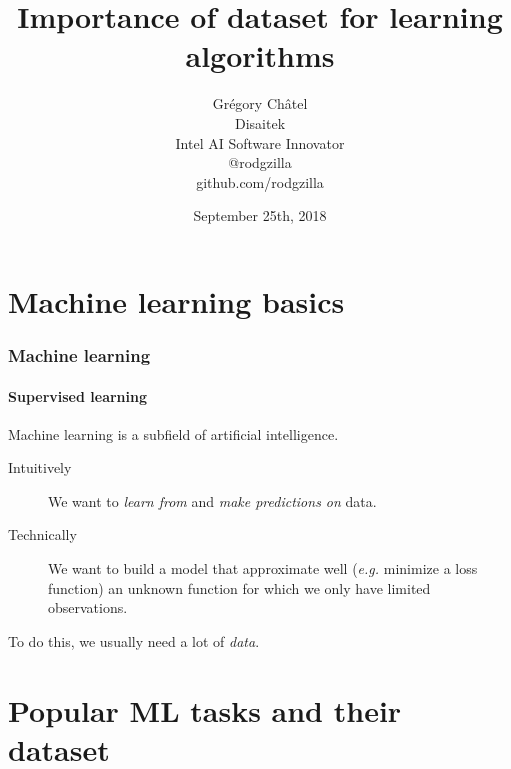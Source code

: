 \documentclass[10pt]{beamer}
\title{Importance of dataset for learning algorithms}
\author[G. Châtel]{Grégory Châtel\\\vspace{0.3cm}Disaitek\\Intel AI Software Innovator\\\vspace{0.3cm}@rodgzilla\\github.com/rodgzilla}
\date{September 25th, 2018}
\begin{document}
\begin{frame}

  \maketitle

\end{frame}

\begin{frame}

  \tableofcontents

\end{frame}

\section{Machine learning basics}

\begin{frame}

  \frametitle{Machine learning}

  \framesubtitle{Supervised learning}

  Machine learning is a subfield of artificial intelligence.

  \bigskip

  \begin{description}
    \item[Intuitively] We want to \emph{learn from} and \emph{make predictions
    on} data.

    \medskip

    \item[Technically] We want to build a model that approximate well
      (\textit{e.g.} minimize a loss function) an unknown function for
      which we only have limited observations.
  \end{description}

  \bigskip

  To do this, we usually need a lot of \emph{data}.

\end{frame}


\section{Popular ML tasks and their dataset}
\end{document}
